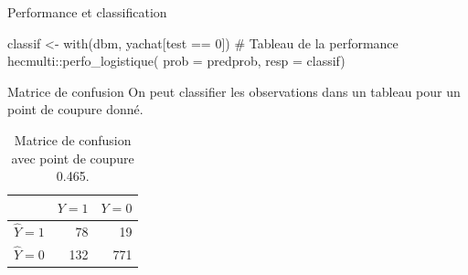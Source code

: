 \documentclass[
  ignorenonframetext,
]{beamer}
\newenvironment{Shaded}{\begin{snugshade}}{\end{snugshade}}
\newcommand{\AttributeTok}[1]{\textcolor[rgb]{0.40,0.45,0.13}{#1}}
\newcommand{\CommentTok}[1]{\textcolor[rgb]{0.37,0.37,0.37}{#1}}
\newcommand{\DecValTok}[1]{\textcolor[rgb]{0.68,0.00,0.00}{#1}}
\newcommand{\FunctionTok}[1]{\textcolor[rgb]{0.28,0.35,0.67}{#1}}
\newcommand{\NormalTok}[1]{\textcolor[rgb]{0.00,0.23,0.31}{#1}}
\newcommand{\OtherTok}[1]{\textcolor[rgb]{0.00,0.23,0.31}{#1}}
\newcommand{\SpecialCharTok}[1]{\textcolor[rgb]{0.37,0.37,0.37}{#1}}
\begin{document}
\begin{frame}[fragile]{Performance et classification}
\protect\hypertarget{performance-et-classification}{}
\begin{Shaded}
\begin{Highlighting}[numbers=left,,]
\NormalTok{classif }\OtherTok{\textless{}{-}} \FunctionTok{with}\NormalTok{(dbm, yachat[test }\SpecialCharTok{==} \DecValTok{0}\NormalTok{])}
\CommentTok{\# Tableau de la performance}
\NormalTok{hecmulti}\SpecialCharTok{::}\FunctionTok{perfo\_logistique}\NormalTok{(}
  \AttributeTok{prob =}\NormalTok{ predprob,}
  \AttributeTok{resp =}\NormalTok{ classif)}
\end{Highlighting}
\end{Shaded}
\end{frame}

\begin{frame}{Matrice de confusion}
\protect\hypertarget{matrice-de-confusion}{}
On peut classifier les observations dans un tableau pour un point de
coupure donné.

\hypertarget{tbl-confumat}{}
\begin{table}
\caption{\label{tbl-confumat}Matrice de confusion avec point de coupure 0.465. }\tabularnewline

\centering
\begin{tabular}{lrr}
\toprule
  & \(Y=1\) & \(Y=0\)\\
\midrule
\(\widehat{Y}=1\) & 78 & 19\\
\(\widehat{Y}=0\) & 132 & 771\\
\bottomrule
\end{tabular}
\end{table}
\end{frame}
\end{document}

